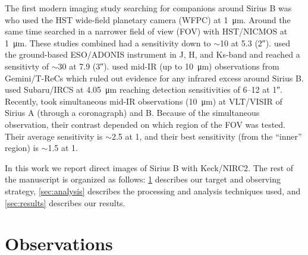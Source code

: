 \documentclass[twocolumn]{aastex631}
\begin{document}
The first modern imaging study searching for companions around Sirius B was \citet{schroeder_search_2000} who used the HST wide-field planetary camera (WFPC) at \qty{1}{\micro\meter}. Around the same time \citet{kuchner_search_2000} searched in a narrower field of view (FOV) with HST/NICMOS at \qty{1}{\micro\meter}. These studies combined had a sensitivity down to $\sim$\qty{10}{\jupitermass} at \qty{5.3}{\au} (\ang{;;2}). \citet{bonnet-bidaud_adonis_2008} used the ground-based ESO/ADONIS instrument in J, H, and Ks-band and reached a sensitivty of $\sim$\qty{30}{\jupitermass} at \qty{7.9}{\au} (\ang{;;3}). \citet{skemer_sirius_2011} used mid-IR (up to \qty{10}{\micro\meter}) observations from Gemini/T-ReCs which ruled out evidence for any infrared excess around Sirius B. \citet{thalmann_piercing_2011} used Subaru/IRCS at \qty{4.05}{\micro\meter} reaching detection sensitivities of \qtyrange{6}{12}{\jupitermass} at \ang{;;1}. Recently, \citet{pathak_high_2021} took simultaneous mid-IR observations (\qty{10}{\micro\meter}) at VLT/VISIR of Sirius A (through a coronagraph) and B. Because of the simultaneous observation, their contrast depended on which region of the FOV was tested. Their average sensitivity is $\sim$\qty{2.5}{\jupitermass} at \qty{1}{\au}, and their best sensitivity (from the ``inner'' region) is $\sim$\qty{1.5}{\jupitermass} at \qty{1}{\au}.

In this work we report direct images of Sirius B with Keck/NIRC2. The rest of the manuscript is organized as follows: \cref{sec:obs} describes our target and observing strategy, \cref{sec:analysis} describes the processing and analysis techniques used, and \cref{sec:results} describes our results.

\section{Observations} \label{sec:obs}
\end{document}
